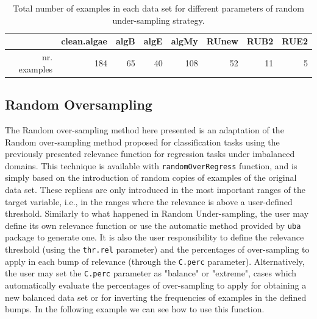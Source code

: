 \documentclass[10pt,a4paper]{article}\usepackage[]{graphicx}\usepackage[]{color}
\begin{document}
\begin{table}[ht]
\centering
\begin{tabular}{rrrrrrrr}
  \hline
 & clean.algae & algB & algE & algMy & RUnew & RUB2 & RUE2 \\ 
  \hline
nr. examples & 184 &  65 &  40 & 108 &  52 &  11 &   5 \\ 
   \hline
\end{tabular}
\caption{Total number of examples in each data set for different parameters of random under-sampling strategy.} 
\label{tab:RUReg_table}
\end{table}




\subsection{Random Oversampling}\label{sec:RORegress}

The Random over-sampling method here presented is an adaptation of the Random over-sampling method proposed for classification tasks using the previously presented relevance function for regression tasks under imbalanced domains. This technique is available with \texttt{randomOverRegress} function, and is simply based on the introduction of random copies of examples of the original data set. These replicas are only introduced in the most important ranges of the target variable, i.e., in the ranges where the relevance is above a user-defined threshold. Similarly to what happened in Random Under-sampling, the user may define its own relevance function or use the automatic method provided by \texttt{uba} package to generate one. It is also the user responsibility to define the relevance threshold (using the \texttt{thr.rel} parameter) and the percentages of over-sampling to apply in each bump of relevance (through the \texttt{C.perc} parameter). Alternatively, the user may set the \texttt{C.perc} parameter as "balance" or "extreme", cases which automatically evaluate the percentages of over-sampling to apply for obtaining a new balanced data set or for inverting the frequencies of examples in the defined bumps.
In the following example we can see how to use this function.
\end{document}
